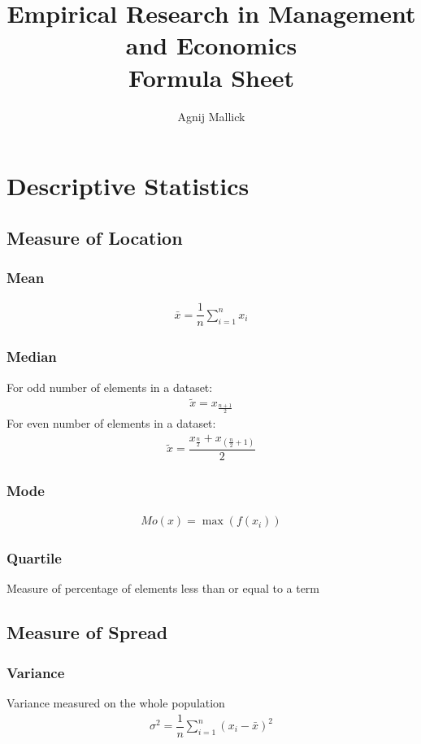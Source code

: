 \documentclass[openany,b5paper]{article}
\title{Empirical Research in Management and Economics\\Formula Sheet}
\author{Agnij Mallick}
\begin{document}
\maketitle

\section{Descriptive Statistics}
\subsection{Measure of Location}
\subsubsection{Mean}
\begin{align}
\bar{x} = \dfrac{1}{n} \displaystyle\sum_{i=1}^{n} x_i
\end{align}
\subsubsection{Median}
For odd number of elements in a dataset:
\begin{align}
\tilde{x} = x_{\frac{n+1}{2}}
\end{align}
For even number of elements in a dataset:
\begin{align}
\tilde{x} = \dfrac{x_{\frac{n}{2}}+x_{\left(\frac{n}{2}+1\right)}}{2}
\end{align}
\subsubsection{Mode}
\begin{align}
Mo(x) = \max(f(x_i))
\end{align}

\subsubsection{Quartile}
Measure of percentage of elements less than or equal to a term

\subsection{Measure of Spread}
\subsubsection{Variance}
Variance measured on the whole population
\begin{align}
\sigma^2 = \dfrac{1}{n} \sum_{i=1}^{n} \left( x_i - \bar{x} \right)^2
\end{align}
\end{document}
